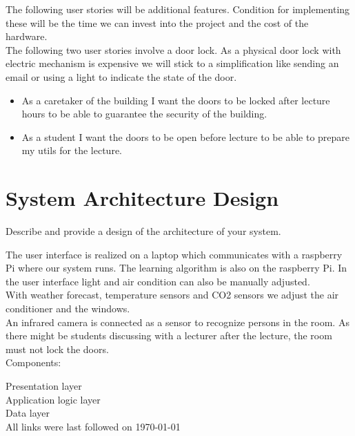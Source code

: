 \documentclass[runningheads]{llncs}
\begin{document}
The following user stories will be additional features. Condition for implementing these will be the time we can invest into the project and the cost of the hardware.\\ 

The following two user stories involve a door lock. As a physical door lock with electric mechanism is expensive we will stick to a simplification like sending an email or using a light to indicate the state of the door.\\
\begin{itemize}
\item As a caretaker of the building I want the doors to be locked after lecture hours to be able to guarantee the security of the building. \\

\item As a student I want the doors to be open before lecture to be able to prepare my utils for the lecture.\\
\end{itemize}

\section{System Architecture Design}
Describe and provide a design of the architecture of your system.

The user interface is realized on a laptop which communicates with a raspberry Pi where our system runs. The learning algorithm is also on the raspberry Pi. In the user interface light and air condition can also be manually adjusted.\\

With weather forecast, temperature sensors and CO2 sensors we adjust the air conditioner and the windows. \\

An infrared camera is connected as a sensor to recognize persons in the room. As there might be students discussing with a lecturer after the lecture, the room must not lock the doors. \\ 



Components:


Presentation layer\\
Application logic layer\\
Data layer \\

%
%



All links were last followed on \today
\end{document}
